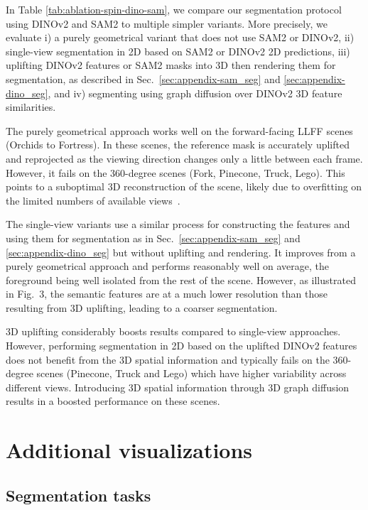 In Table \ref{tab:ablation-spin-dino-sam}, we compare our segmentation protocol using DINOv2 and SAM2 to multiple simpler variants. More precisely, we evaluate i) a purely geometrical variant that does not use SAM2 or DINOv2, ii) single-view segmentation in 2D based on SAM2 or DINOv2 2D predictions, iii) uplifting DINOv2 features or SAM2 masks into 3D then rendering them for segmentation, as described in Sec.~\ref{sec:appendix-sam_seg} and \ref{sec:appendix-dino_seg}, and iv) segmenting using graph diffusion over DINOv2 3D feature similarities.

The purely geometrical approach works well on the forward-facing LLFF scenes (Orchids to Fortress). In these scenes, the reference mask is accurately uplifted and reprojected as the viewing direction changes only a little between each frame. However, it fails on the 360-degree scenes (Fork, Pinecone, Truck, Lego). This points to a suboptimal 3D reconstruction of the scene, likely due to overfitting on the limited numbers of available views~\citep{chung2024depth}.

The single-view variants use a similar process for constructing the features and using them for segmentation as in Sec.~\ref{sec:appendix-sam_seg} and \ref{sec:appendix-dino_seg} but without uplifting and rendering. It improves from a purely geometrical approach and performs reasonably well on average, the foreground being well isolated from the rest of the scene. However, as illustrated in Fig.~3, %
the semantic features are at a much lower resolution than those resulting from 3D uplifting, leading to a coarser segmentation.

3D uplifting considerably boosts results compared to single-view approaches. However, performing segmentation in 2D based on the uplifted DINOv2 features does not benefit from the 3D spatial information and typically fails on the 360-degree scenes (Pinecone, Truck and Lego) which have higher variability across different views. Introducing 3D spatial information through 3D graph diffusion results in a boosted performance on these scenes.

\section{Additional visualizations}

\subsection{Segmentation tasks}

